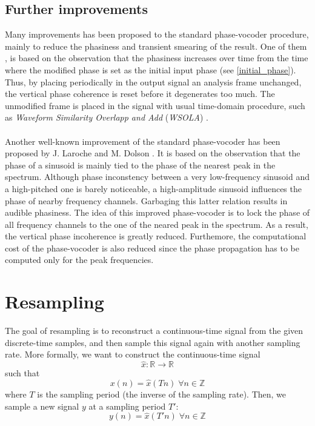 \documentclass[letterpaper]{article}
\theoremstyle{definition}
\theoremstyle{remark}
\theoremstyle{plain}
\begin{document}
\subsection{Further improvements}
Many improvements has been proposed to the standard phase-vocoder procedure,
mainly to reduce the phasiness and transient smearing of the result. One of
them \citep{Dorran_audiotime_scale, Kraft2012ImprovedPT}, is based on the
observation that the phasiness increases over time from the time where the
modified phase is set as the initial input phase (see \eqref{initial_phase}).
Thus, by placing periodically in the output signal an analysis frame unchanged,
the vertical phase coherence is reset before it degenerates too much. The
unmodified frame is placed in the signal with usual time-domain procedure,
such as \emph{Waveform Similarity Overlapp and Add} (\emph{WSOLA})
\citep{Verhelst1993}.

\paragraph{}
Another well-known improvement of the standard phase-vocoder has been proposed
by J. Laroche and M. Dolson \citep{Laroche1999}. It is based on the observation
that the phase of a sinusoid is mainly tied to the phase of the nearest peak
in the spectrum. Although phase inconstency between a very low-frequency
sinusoid and a high-pitched one is barely noticeable, a high-amplitude sinusoid
influences the phase of nearby frequency channels. Garbaging this latter
relation results in audible phasiness. The idea of this improved phase-vocoder
is to lock the phase of all frequency channels to the one of the neared peak
in the spectrum. As a result, the vertical phase incoherence is greatly reduced.
Furthemore, the computational cost of the phase-vocoder is also reduced since
the phase propagation has to be computed only for the peak frequencies.

\section{Resampling}
The goal of resampling is to reconstruct a continuous-time signal from the given
discrete-time samples, and then sample this signal again with another sampling
rate. More formally, we want to construct the continuous-time signal
\begin{equation}\hat x:\mathbb{R}\to\mathbb{R}\end{equation}
such that
\begin{equation}x(n) = \hat x(Tn) \;\forall n\in\mathbb{Z}\end{equation}
where \(T\) is the sampling period (the inverse of the sampling rate). Then, we
sample a new signal \(y\) at a sampling period \(T'\):
\begin{equation*}y(n) = \hat x(T'n) \;\forall n\in\mathbb{Z}\end{equation*}
\end{document}
